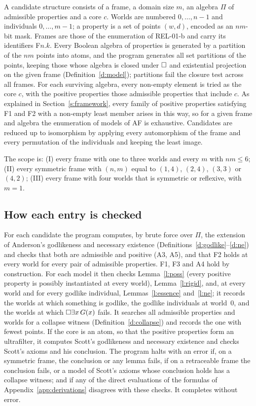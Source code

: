 \documentclass{situationist-preprint}
\begin{document}
A candidate structure consists of a frame, a domain size $m$, an algebra $\Pi$ of admissible properties and a core $c$. Worlds are numbered $0, \ldots, n-1$ and individuals $0, \ldots, m-1$; a property is a set of points $(w,d)$, encoded as an $nm$-bit mask. Frames are those of the enumeration of REL-01-b and carry its identifiers F$n$.$k$. Every Boolean algebra of properties is generated by a partition of the $nm$ points into atoms, and the program generates all set partitions of the points, keeping those whose algebra is closed under $\mathord{\Box}$ and existential projection on the given frame (Definition~\ref{d:model}); \csRejClosure{} partitions fail the closure test across all frames. For each surviving algebra, every non-empty element is tried as the core $c$, with the positive properties those admissible properties that include $c$. As explained in Section~\ref{s:framework}, every family of positive properties satisfying F1 and F2 with a non-empty least member arises in this way, so for a given frame and algebra the enumeration of models of AF is exhaustive. Candidates are reduced up to isomorphism by applying every automorphism of the frame and every permutation of the individuals and keeping the least image.

The scope is: (I) every frame with one to three worlds and every $m$ with $nm \leq 6$; (II) every symmetric frame with $(n,m)$ equal to $(1,4)$, $(2,4)$, $(3,3)$ or $(4,2)$; (III) every frame with four worlds that is symmetric or reflexive, with $m = 1$.

\subsection{How each entry is checked}

For each candidate the program computes, by brute force over $\Pi$, the extension of Anderson's godlikeness and necessary existence (Definitions~\ref{d:godlike}--\ref{d:ne}) and checks that both are admissible and positive (A3, A5), and that F2 holds at every world for every pair of admissible properties. F1, F3 and A4 hold by construction. For each model it then checks Lemma~\ref{l:poss} (every positive property is possibly instantiated at every world), Lemma~\ref{l:rigid}, and, at every world and for every godlike individual, Lemmas~\ref{l:essence} and~\ref{l:ne}; it records the worlds at which something is godlike, the godlike individuals at world~0, and the worlds at which $\mathord{\Box}\exists x\,G(x)$ fails. It searches all admissible properties and worlds for a collapse witness (Definition~\ref{d:collapse}) and records the one with fewest points. If the core is an atom, so that the positive properties form an ultrafilter, it computes Scott's godlikeness and necessary existence and checks Scott's axioms and his conclusion. The program halts with an error if, on a symmetric frame, the conclusion or any lemma fails, if on a retraceable frame the conclusion fails, or a model of Scott's axioms whose conclusion holds has a collapse witness; and if any of the direct evaluations of the formulas of Appendix~\ref{app:derivations} disagrees with these checks. It completes without error.
\end{document}
